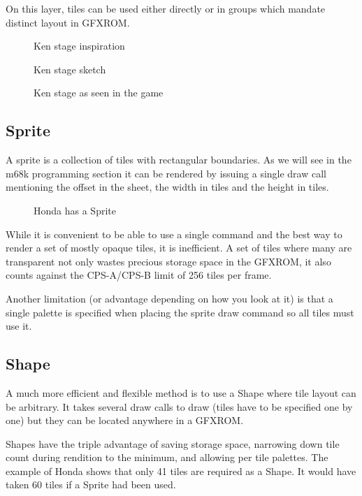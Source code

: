 On this layer, tiles can be used either directly or in groups which mandate distinct layout in GFXROM.

\begin{figure}[H]
\caption*{Ken stage inspiration}
\end{figure}

\begin{figure}[H]
\caption*{Ken stage sketch\cite{sf2completefiles}}
\end{figure}

\begin{figure}[H]
\caption*{Ken stage as seen in the game}
\end{figure}


\subsection{Sprite}
A sprite is a collection of tiles with rectangular boundaries. As we will see in the m68k programming section it can be rendered by issuing a single draw call mentioning the offset in the sheet, the width in tiles and the height in tiles.

 \begin{figure}[H]
\caption*{Honda has a Sprite}
\end{figure}

While it is convenient to be able to use a single command and the best way to render a set of mostly opaque tiles, it is inefficient. A set of tiles where many are transparent not only wastes precious storage space in the GFXROM, it also counts against the CPS-A/CPS-B limit of 256 tiles per frame.

Another limitation (or advantage depending on how you look at it) is that a single palette is specified when placing the sprite draw command so all tiles must use it.

\subsection{Shape}

A much more efficient and flexible method is to use a Shape where tile layout can be arbitrary. It takes several draw calls to draw (tiles have to be specified one by one) but they can be located anywhere in a GFXROM.

Shapes have the triple advantage of saving storage space, narrowing down tile count during rendition to the minimum, and allowing per tile palettes. The example of Honda shows that only 41 tiles are required as a Shape. It would have taken 60 tiles if a Sprite had been used.

